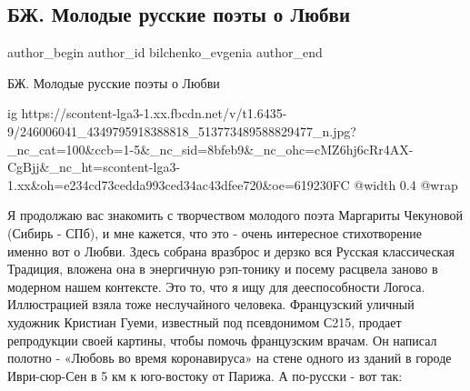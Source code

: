 
 
 
 
 
 
\subsection{БЖ. Молодые русские поэты о Любви}
\label{sec:16_10_2021.fb.bilchenko_evgenia.2.poezia_ljubov_chekanova_margarita}
 
\ifcmt
 author_begin
   author_id bilchenko_evgenia
 author_end
\fi

БЖ. Молодые русские поэты о Любви

\ifcmt
  ig https://scontent-lga3-1.xx.fbcdn.net/v/t1.6435-9/246006041_4349795918388818_513773489588829477_n.jpg?_nc_cat=100&ccb=1-5&_nc_sid=8bfeb9&_nc_ohc=cMZ6hj6cRr4AX-CgBjj&_nc_ht=scontent-lga3-1.xx&oh=e234cd73cedda993ced34ac43dfee720&oe=619230FC
  @width 0.4
  @wrap 
\fi

Я продолжаю вас знакомить с творчеством молодого поэта Маргариты Чекуновой
(Сибирь - СПб), и мне кажется, что это - очень интересное стихотворение именно
вот о Любви. Здесь собрана вразброс и дерзко вся Русская классическая Традиция,
вложена она в энергичную рэп-тонику и посему расцвела заново в модерном нашем
контексте. Это то, что я ищу для дееспособности Логоса. Иллюстрацией взяла тоже
неслучайного человека. Французский уличный художник Кристиан Гуеми, известный
под псевдонимом С215, продает репродукции своей картины, чтобы помочь
французским врачам. Он написал полотно - «Любовь во время коронавируса» на
стене одного из зданий в городе Иври-сюр-Сен в 5 км к юго-востоку от Парижа. А
по-русски - вот так:

